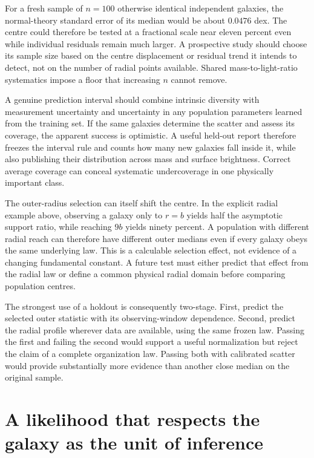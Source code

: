For a fresh sample of $n=100$ otherwise identical independent galaxies, the normal-theory standard error of its median would be about $0.0476$ dex. The centre could therefore be tested at a fractional scale near eleven percent even while individual residuals remain much larger. A prospective study should choose its sample size based on the centre displacement or residual trend it intends to detect, not on the number of radial points available. Shared mass-to-light-ratio systematics impose a floor that increasing $n$ cannot remove.

A genuine prediction interval should combine intrinsic diversity with measurement uncertainty and uncertainty in any population parameters learned from the training set. If the same galaxies determine the scatter and assess its coverage, the apparent success is optimistic. A useful held-out report therefore freezes the interval rule and counts how many new galaxies fall inside it, while also publishing their distribution across mass and surface brightness. Correct average coverage can conceal systematic undercoverage in one physically important class.

The outer-radius selection can itself shift the centre. In the explicit radial example above, observing a galaxy only to $r=b$ yields half the asymptotic support ratio, while reaching $9b$ yields ninety percent. A population with different radial reach can therefore have different outer medians even if every galaxy obeys the same underlying law. This is a calculable selection effect, not evidence of a changing fundamental constant. A future test must either predict that effect from the radial law or define a common physical radial domain before comparing population centres.

The strongest use of a holdout is consequently two-stage. First, predict the selected outer statistic with its observing-window dependence. Second, predict the radial profile wherever data are available, using the same frozen law. Passing the first and failing the second would support a useful normalization but reject the claim of a complete organization law. Passing both with calibrated scatter would provide substantially more evidence than another close median on the original sample.

\section{A likelihood that respects the galaxy as the unit of inference}


